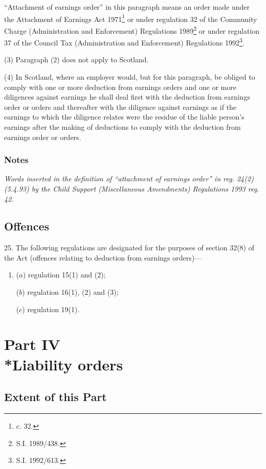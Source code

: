 \documentclass[a4paper]{article}
\newcommand{\parthead}{}
\newcommand\amendment[1]{\subsubsection*{Notes}{\itshape\frenchspacing\footnotesize #1 \par}}
\begin{document}
“Attachment of earnings order” in this paragraph means an order made under the Attachment of Earnings Act 1971\footnote{ c. 32.} or under regulation 32 of the Community Charge (Administration and Enforcement) Regulations 1989\footnote{\frenchspacing S.I. 1989/438.}
or under regulation 37 of the Council Tax (Administration and Enforcement) Regulations 1992\footnote{\frenchspacing  S.I. 1992/613.}. %

(3) Paragraph (2) does not apply to Scotland.

(4) In Scotland, where an employer would, but for this paragraph, be obliged to comply with one or more deduction from earnings orders and one or more diligences against earnings he shall deal first with the deduction from earnings order or orders and thereafter with the diligence against earnings as if the earnings to which the diligence relates were the residue of the liable person’s earnings after the making of deductions to comply with the deduction from earnings order or orders.

\amendment{
Words inserted in the definition of ``attachment of earnings order'' in reg. 24(2) (5.4.93) by the Child Support (Miscellaneous Amendments) Regulations 1993 reg. 42.
}

\subsection[25. Offences]{Offences}

25.  The following regulations are designated for the purposes of section 32(8) of the Act (offences relating to deduction from earnings orders)—
\begin{enumerate}\item[]
($a$) regulation 15(1) and (2);

($b$) regulation 16(1), (2) and (3);

($c$) regulation 19(1).
\end{enumerate}

\section[Part IV --- Liability orders]{Part IV\\*Liability orders}

\renewcommand\parthead{--- Part IV}

\subsection[26. Extent of this Part]{Extent of this Part}
\end{document}
